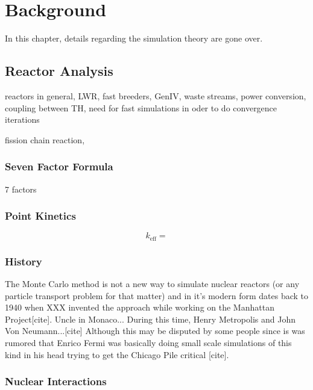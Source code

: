 \chapter{Background}

In this chapter, details regarding the simulation theory are gone over.  

\section{Reactor Analysis}

reactors in general, LWR, fast breeders, GenIV, waste streams, power conversion, coupling between TH, need for fast simulations in oder to do convergence iterations

fission chain reaction, 

\subsection{Seven Factor Formula}
 7 factors

\subsection{Point Kinetics}

\begin{equation}
\label{keff}
k_\mathrm{eff} = 
\end{equation}







\subsection{History}

The Monte Carlo method is not a new way to simulate nuclear reactors (or any particle transport problem for that matter) and in it's modern form dates back to 1940 when XXX invented the approach while working on the Manhattan Project[cite]. Uncle in Monaco...  During this time, Henry Metropolis and John Von Neumann...[cite]  Although this may be disputed by some people since is was rumored that Enrico Fermi was basically doing small scale simulations of this kind in his head trying to get the Chicago Pile critical [cite].



\subsection{Nuclear Interactions}

